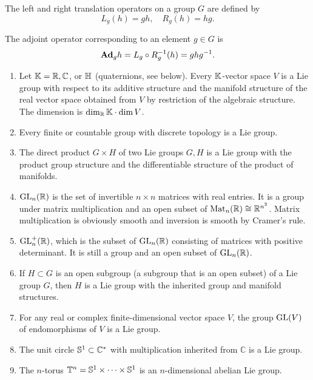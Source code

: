 \begin{defn}
    The left and right translation operators on a group $G$ are defined by
    \[L_g(h)=gh,\quad R_g(h)=hg.\]
    
    The adjoint operator corresponding to an element $g\in G$ is
    \[\mathrm{\mathbf{Ad}}_g h=L_g\circ R_g^{-1}(h)=ghg^{-1}.\]
\end{defn}


\begin{example}
    \begin{enumerate}[label=(\alph*)]
        \item Let $\mathbb{K}=\mathbb{R} ,\mathbb{C}$, or $\mathbb{H} $ (quaternions, see below). Every $\mathbb{K}$-vector space $V$ is a Lie group with respect to its additive structure and the manifold structure of the real vector space obtained from $V$ by restriction of the algebraic structure. The dimension is $\dim_{\mathbb{R} }\mathbb{K}\cdot \dim V$.
        \item Every finite or countable group with discrete topology is a Lie group.
        \item The direct product $G\times H$ of two Lie groups $G,H$ is a Lie group with the product group structure and the differentiable structure of the product of manifolds.
        \item $\operatorname{GL}_n(\mathbb{R} )$ is the set of invertible $n\times n$ matrices with real entries. It is a group under matrix multiplication and an open subset of $\operatorname{Mat}_n(\mathbb{R} )\cong \mathbb{R}^{n^2}$. Matrix multiplication is obviously smooth and inversion is smooth by Cramer's rule.
        \item $\operatorname{GL}^+_n(\mathbb{R} )$, which is the subset of $\operatorname{GL}_n(\mathbb{R} )$ consisting of matrices with positive determinant. It is still a group and an open subset of $\operatorname{GL}_n(\mathbb{R} )$.
        \item If $H\subset G$ is an open subgroup (a subgroup that is an open subset) of a Lie group $G$, then $H$ is a Lie group with the inherited group and manifold structures.
        \item For any real or complex finite-dimensional vector space $V$, the group $\operatorname{GL}(V)$ of endomorphisms of $V$ is a Lie group.
        \item The unit circle $\mathbb{S}^1\subset \mathbb{C}^\ast$ with multiplication inherited from $\mathbb{C}$ is a Lie group.
        \item The $n$-torus $\mathbb{T}^n=\mathbb{S}^1\times\cdots\times \mathbb{S}^1$ is an $n$-dimensional abelian Lie group.
    \end{enumerate}
\end{example}

